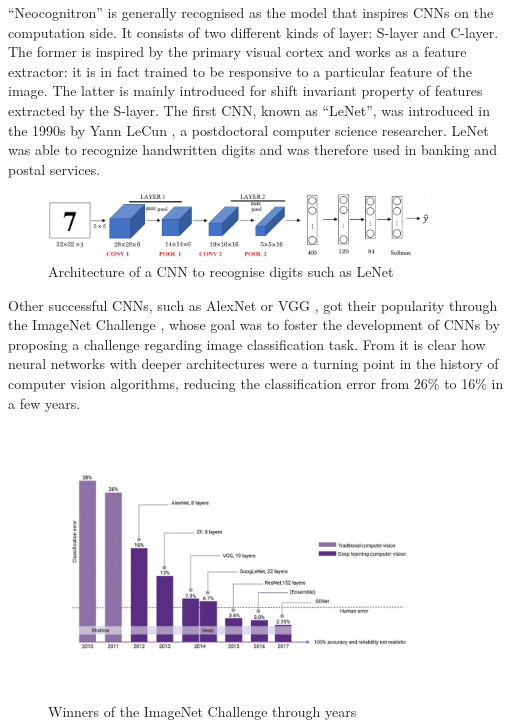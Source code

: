 \documentclass[12pt,a4paper]{report}
\theoremstyle{definition}
\begin{document}
 ``Neocognitron'' \cite{neocognitron} is generally recognised as the model that inspires CNNs on the computation side. It consists of two different kinds of layer: S-layer and C-layer. The former is inspired by the primary visual cortex and works as a feature extractor: it is in fact trained to be responsive to a particular feature of the image. The latter is mainly introduced for shift invariant property of features extracted by the S-layer. The first CNN, known as ``LeNet'', was introduced in the 1990s by Yann LeCun \cite{LeNet}, a postdoctoral computer science researcher. LeNet was able to recognize handwritten digits and was therefore used in banking and postal services.
 \begin{figure}[h]
     \centering
     \includegraphics[width = 0.9\textwidth]{Images/LeNet_.jpg}
     \caption{Architecture of a CNN to recognise digits such as LeNet}
     \label{fig:LeNet}
 \end{figure}
 Other successful CNNs, such as AlexNet \cite{AlexNet} or VGG \cite{VGG}, got their popularity through the ImageNet Challenge \cite{ImageNet}, whose goal was to foster the development of CNNs by proposing a challenge regarding image classification task. From  it is clear how neural networks with deeper architectures were a turning point in the history of computer vision algorithms, reducing the classification error from 26\% to 16\% in a few years.

\begin{figure}[h]
    \centering
    \includegraphics[trim={1cm 3.3cm 1cm 3cm},clip,width=0.9\textwidth]{./Images/ImageNet.pdf}
    \caption{Winners of the ImageNet Challenge through years}
    \label{fig:imagenet}
\end{figure}
\end{document}
